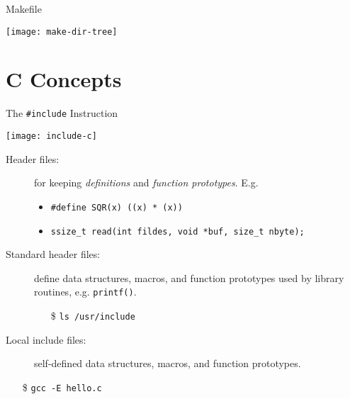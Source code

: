 \begin{frame}{Makefile}
  \begin{minipage}{.75\linewidth}
  \end{minipage}
  \begin{minipage}{.2\linewidth}
    \texttt{[image: make-dir-tree]}
  \end{minipage}
\end{frame}

\section{C Concepts}

\begin{frame}[fragile]{The \texttt{\#include} Instruction}
  \begin{center}
    \texttt{[image: include-c]}
  \end{center}
\begin{description}
\item[Header files:] for keeping \emph{definitions} and \emph{function prototypes}. E.g.
  \begin{itemize}
  \item \texttt{#define SQR(x) ((x) * (x))}
  \item \texttt{ssize_t read(int fildes, void *buf, size_t nbyte);}
  \end{itemize}
\item[Standard header files:] define data structures, macros, and function
  prototypes used by library routines, e.g. \texttt{printf()}.
  \begin{itemize}
  \item[\$] \texttt{ls /usr/include}
  \end{itemize}
\item[Local include files:] self-defined data structures, macros, and
  function prototypes.
\end{description}
\begin{itemize}
\item[\$] \texttt{gcc -E hello.c}
\end{itemize}
\end{frame}

